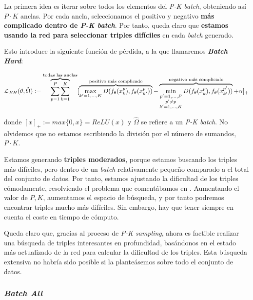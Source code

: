 La primera idea es iterar sobre todos los elementos del \textit{P-K batch}, obteniendo así $P \cdot K$ anclas. Por cada ancla, seleccionamos el positivo y negativo \textbf{más complicado dentro de \textit{P-K batch}}. Por tanto, queda claro que \textbf{estamos usando la red para seleccionar triples difíciles} en cada \textit{batch} generado.

Esto introduce la siguiente función de pérdida, a la que llamaremos \textbf{\textit{Batch Hard}}:

\begin{equation}
    \mathcal{L}_{BH}(\theta, \hat{\Omega}) := \overbrace{\sum_{p = 1}^P \sum_{k = 1}^K}^\textrm{\text{todas las anclas}} [
        \overbrace{\max_{k' = 1, \ldots, K} D(f_{\theta}(x_k^p), f_{\theta}(x_{k'}^p))}^\textrm{\text{positivo más complicado}}
        - \overbrace{\min_{\substack{p' = 1, \ldots, P \\ p' \neq p \\ k' = 1, \ldots, K}} D(f_{\theta}(x_k^p), f_{\theta}(x_{k'}^{p'}))}^\textrm{\text{negativo más complicado}}
        + \alpha]_+
\end{equation}

donde $[x]_+ := max \{0, x\} = ReLU(x)$ y $\hat{\Omega}$ se refiere a un \textit{P-K batch}. No olvidemos que no estamos escribiendo la división por el número de sumandos, $P \cdot K$.

Estamos generando \textbf{triples moderados}, porque estamos buscando los triples más difíciles, pero dentro de un \textit{batch} relativamente pequeño comparado a el total del conjunto de datos. Por tanto, estamos ajustando la dificultad de los triples cómodamente, resolviendo el problema que comentábamos en . Aumentando el valor de $P, K$, aumentamos el espacio de búsqueda, y por tanto podremos encontrar triples mucho más difíciles. Sin embargo, hay que tener siempre en cuenta el coste en tiempo de cómputo.

Queda claro que, gracias al proceso de \textit{P-K sampling}, ahora es factible realizar una búsqueda de triples interesantes en profundidad, basándonos en el estado más actualizado de la red para calcular la dificultad de los triples. Esta búsqueda extensiva no habría sido posible si la planteásemos sobre todo el conjunto de datos.

\subsubsection{\textit{Batch All}} \label{isubsubs:batch_all}

